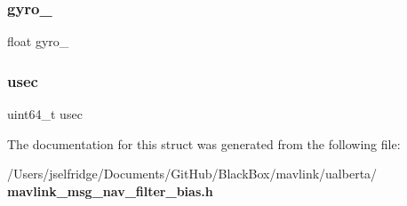 \subsubsection{gyro\+\_}
{\footnotesize\ttfamily float gyro\+\_}

\mbox{\label{struct____mavlink__nav__filter__bias__t_addac5bd19af4aead62cc3b879b5be400}} 
\subsubsection{usec}
{\footnotesize\ttfamily uint64\+\_\+t usec}



The documentation for this struct was generated from the following file\+:\begin{DoxyCompactItemize}
\item 
/\+Users/jselfridge/\+Documents/\+Git\+Hub/\+Black\+Box/mavlink/ualberta/\textbf{ mavlink\+\_\+msg\+\_\+nav\+\_\+filter\+\_\+bias.\+h}\end{DoxyCompactItemize}
